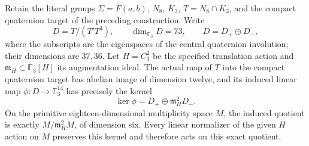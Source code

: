 \begin{lemma}
\label{lem:faithful-detector-augmentation-kernel}
Retain the literal groups \(\Sigma=F(a,b)\),
\(N_8\), \(K_3\), \(T=N_8\cap K_3\),
and the compact quaternion target of the preceding
construction. Write
\[
 D=T/(T'T^3),\qquad \dim_{\mathbb F_3}D=73,
 \qquad D=D_+\oplus D_-,
 \tag{FK.1}
\]
where the subscripts are the eigenspaces of the
central quaternion involution; their dimensions
are \(37,36\).
Let \(H=C_3^2\) be the specified translation
action and \(\mathfrak m_H\subset\mathbb F_3[H]\)
its augmentation ideal. The actual map of
\(T\) into the compact quaternion target has
abelian image of dimension twelve, and its
induced linear map \(\phi:D\to\mathbb F_3^{14}\)
has precisely the kernel
\[
 \ker\phi=D_+\oplus\mathfrak m_H^2D_-.
 \tag{FK.2}
\]
On the primitive eighteen-dimensional multiplicity
space \(M\), the induced quotient is exactly
\(M/\mathfrak m_H^2M\), of dimension six.
Every linear normalizer of the given \(H\)
action on \(M\) preserves this kernel and
therefore acts on this exact quotient.
\end{lemma}
